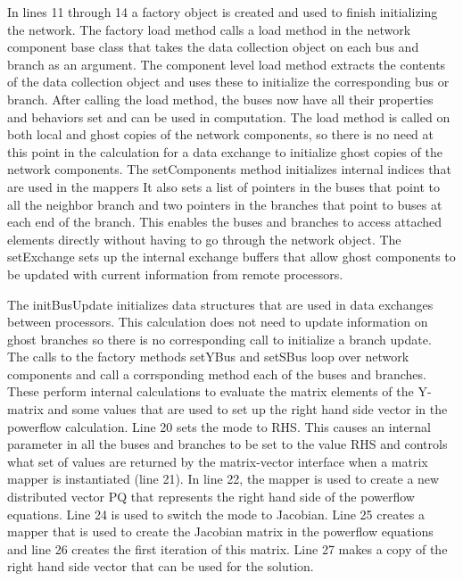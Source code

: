 \documentclass[preprint]{acm_proc_article-sp}
\begin{document}
In lines 11 through 14 a factory object is created and used to finish
initializing the network. The factory load method calls a load method in the
network component base class that takes the data collection object on each bus
and branch as an argument. The component level load method extracts the contents
of the data collection object and uses these to initialize the corresponding bus
or branch. After calling the load method, the buses now have all their
properties and behaviors set and can be used in computation. The load method is
called on both local and ghost copies of the network components, so there is no
need at this point in the calculation for a data exchange to initialize ghost
copies of the network components. The setComponents method initializes internal
indices that are used in the mappers It also sets a list of pointers in the
buses that point to all the neighbor branch and two pointers in the branches
that point to buses at each end of the branch. This enables the buses and
branches to access attached elements directly without having to go through the
network object. The setExchange sets up the internal exchange buffers that allow
ghost components to be updated with current information from remote processors.

The initBusUpdate initializes data structures that are used in data exchanges
between processors. This calculation does not need to update information on
ghost branches so there is no corresponding call to initialize a branch update.
The calls to the factory methods setYBus and setSBus loop over network
components and call a corrsponding method each of the buses and branches. These
perform internal calculations to evaluate the matrix elements of the Y-matrix
and some values that are used to set up the right hand side vector in the
powerflow calculation. Line 20 sets the mode to RHS. This causes an internal
parameter in all the buses and branches to be set to the value RHS and controls
what set of values are returned by the matrix-vector interface when a matrix
mapper is instantiated (line 21). In line 22, the mapper is used to create a new
distributed vector PQ that represents the right hand side of the powerflow
equations. Line 24 is used to switch the mode to Jacobian. Line 25 creates a
mapper that is used to create the Jacobian matrix in the powerflow equations and
line 26 creates the first iteration of this matrix. Line 27 makes a copy of the
right hand side vector that can be used for the solution.
\end{document}
